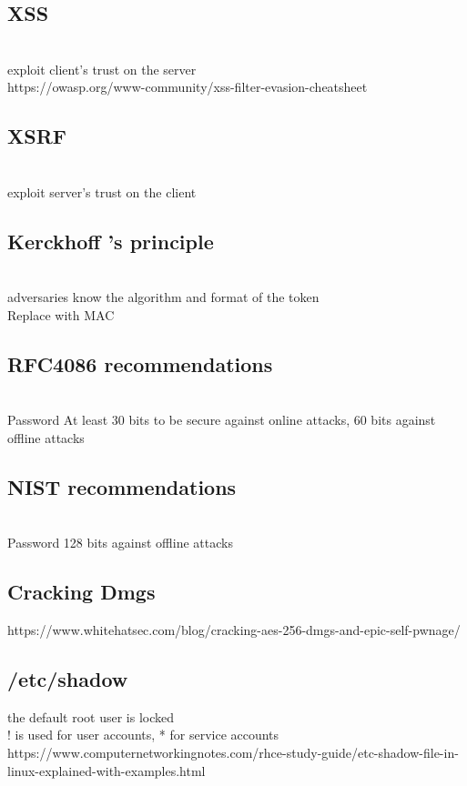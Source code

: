 \documentclass[11pt]{article}
\begin{document}
\begin{multicols*}{3}
\subsection*{XSS}\\
exploit client's trust on the server\\
\textcolor{link}{https://owasp.org/www-community/xss-filter-evasion-cheatsheet}
\subsection*{XSRF}\\
exploit server's trust on the client\\
\subsection*{Kerckhoff  ’s principle}\\
adversaries know the
algorithm and format of the token\\
Replace with MAC
\\
\subsection*{RFC4086 recommendations}\\
Password At least 30 bits to be secure against online attacks, 60 bits against offline attacks \\
\subsection*{NIST recommendations}\\
Password 128 bits against offline attacks 
\subsection*{Cracking Dmgs}
\textcolor{link}{https://www.whitehatsec.com/blog/cracking-aes-256-dmgs-and-epic-self-pwnage/}
\\
\subsection*{/etc/shadow}
the default root user is locked
\\
! is used for user accounts, * for service accounts\\
\textcolor{link}{https://www.computernetworkingnotes.com/rhce-study-guide/etc-shadow-file-in-linux-explained-with-examples.html}

\end{multicols*}
\end{document}
